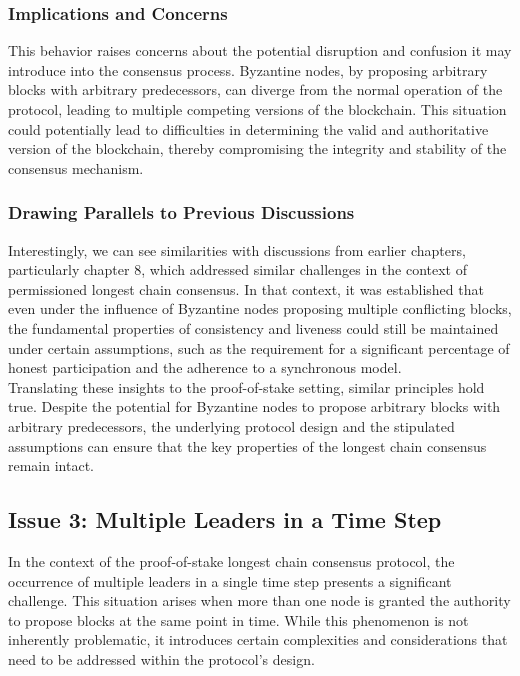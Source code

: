 \subsubsection{Implications and Concerns}
This behavior raises concerns about the potential disruption and confusion it may introduce into the consensus process. Byzantine nodes, by proposing arbitrary blocks with arbitrary predecessors, can diverge from the normal operation of the protocol, leading to multiple competing versions of the blockchain. This situation could potentially lead to difficulties in determining the valid and authoritative version of the blockchain, thereby compromising the integrity and stability of the consensus mechanism.

\subsubsection{Drawing Parallels to Previous Discussions}
Interestingly, we can see similarities with discussions from earlier chapters, particularly chapter 8, which addressed similar challenges in the context of permissioned longest chain consensus. In that context, it was established that even under the influence of Byzantine nodes proposing multiple conflicting blocks, the fundamental properties of consistency and liveness could still be maintained under certain assumptions, such as the requirement for a significant percentage of honest participation and the adherence to a synchronous model.\\
Translating these insights to the proof-of-stake setting, similar principles hold true. Despite the potential for Byzantine nodes to propose arbitrary blocks with arbitrary predecessors, the underlying protocol design and the stipulated assumptions can ensure that the key properties of the longest chain consensus remain intact.

\subsection{Issue 3: Multiple Leaders in a Time Step}
In the context of the proof-of-stake longest chain consensus protocol, the occurrence of multiple leaders in a single time step presents a significant challenge. This situation arises when more than one node is granted the authority to propose blocks at the same point in time. While this phenomenon is not inherently problematic, it introduces certain complexities and considerations that need to be addressed within the protocol's design.

